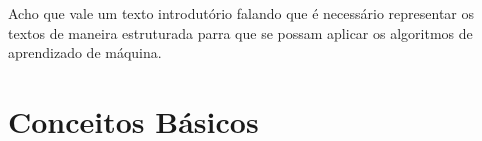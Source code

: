 













Acho que vale um texto introdutório falando que é necessário representar os textos de maneira estruturada parra que se possam aplicar os algoritmos de aprendizado de máquina. 




















\section{Conceitos Básicos}

































































